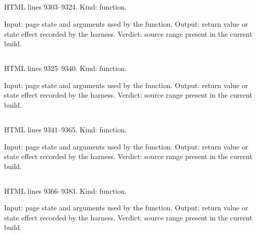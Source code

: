 \subsection*{\texttt{}}
\label{vf_508_controlCategory}
HTML lines 9303--9324. Kind: function.

Input: page state and arguments used by the function.
Output: return value or state effect recorded by the harness.
Verdict: source range present in the current build.

\subsection*{\texttt{}}
\label{vf_509_detectedControlRoots}
HTML lines 9325--9340. Kind: function.

Input: page state and arguments used by the function.
Output: return value or state effect recorded by the harness.
Verdict: source range present in the current build.

\subsection*{\texttt{}}
\label{vf_510_renderControlCategoryEditor}
HTML lines 9341--9365. Kind: function.

Input: page state and arguments used by the function.
Output: return value or state effect recorded by the harness.
Verdict: source range present in the current build.

\subsection*{\texttt{}}
\label{vf_511_westgardReview}
HTML lines 9366--9383. Kind: function.

Input: page state and arguments used by the function.
Output: return value or state effect recorded by the harness.
Verdict: source range present in the current build.

